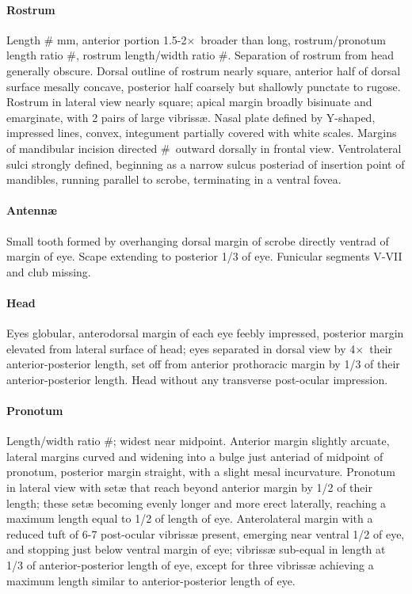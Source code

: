 \documentclass[fleqn,10pt,lineno]{wlpeerj} %
\newcommand{\td}{\textdegree~}
\newcommand{\x}{$\times$~}
\begin{document}
			\paragraph{Rostrum}
				Length \# mm, anterior portion 1.5-2\x broader than long, rostrum/pronotum length ratio \#, rostrum length/width ratio \#.
				Separation of rostrum from head generally obscure. 
				Dorsal outline of rostrum nearly square, anterior half of dorsal surface mesally concave, posterior half coarsely but shallowly punctate to rugose. 
				Rostrum in lateral view nearly square; apical margin broadly bisinuate and emarginate, with 2 pairs of large vibriss{\ae}. 
				Nasal plate defined by Y-shaped, impressed lines, convex, integument partially covered with white scales.
				Margins of mandibular incision directed \#\td outward dorsally in frontal view. 
				Ventrolateral sulci strongly defined, beginning as a narrow sulcus posteriad of insertion point of mandibles, running parallel to scrobe, terminating in a ventral fovea.
			\paragraph{Antenn{\ae}}
				Small tooth formed by overhanging dorsal margin of scrobe directly ventrad of margin of eye.
				Scape extending to posterior 1/3 of eye.
				Funicular segments V-VII and club missing.
			\paragraph{Head}
				Eyes globular, anterodorsal margin of each eye feebly impressed, posterior margin elevated from lateral surface of head; eyes separated in dorsal view by 4\x their anterior-posterior length, set off from anterior prothoracic margin by 1/3 of their anterior-posterior length. 
				Head without any transverse post-ocular impression.
			\paragraph{Pronotum}
				Length/width ratio \#; widest near midpoint. 
				Anterior margin slightly arcuate, lateral margins curved and widening into a bulge just anteriad of midpoint of pronotum, posterior margin straight, with a slight mesal incurvature. 
				Pronotum in lateral view with set{\ae} that reach beyond anterior margin by 1/2 of their length; these set{\ae} becoming evenly longer and more erect laterally, reaching a maximum length equal to 1/2 of length of eye. 
				Anterolateral margin with a reduced tuft of 6-7 post-ocular vibriss{\ae} present, emerging near ventral 1/2 of eye, and stopping just below ventral margin of eye; vibriss{\ae} sub-equal in length at 1/3 of anterior-posterior length of eye, except for three vibriss{\ae} achieving a maximum length similar to anterior-posterior length of eye.
\end{document}
